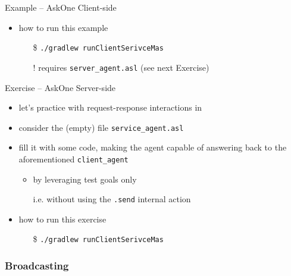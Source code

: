 \documentclass[presentation]{beamer}\mode<presentation>{\usetheme{AMSBolognaFC}}
\begin{document}
\begin{frame}[c, allowframebreaks]{Example \theJasonExample{} -- AskOne Client-side}
\begin{itemize}
    \vspace{.3cm}
    
    \item how to run this example
    \begin{itemize}
        \item[\$] \texttt{./gradlew run\alert{ClientSerivce}Mas}
        \item[!] requires \texttt{server\_agent.asl} (see next Exercise) 
    \end{itemize}
    
\end{itemize}
\end{frame}

\begin{frame}[c, allowframebreaks]{Exercise \theJasonExample{} -- AskOne Server-side}
\begin{itemize}
    \item let's practice with request-response interactions in \jason{}
    
    \vspace{.3cm}
    
    \item consider the (empty) file \texttt{service\_agent.asl}
    
    \vspace{.3cm}
    
    \item fill it with some \jason{} code, making the agent capable of answering back to the aforementioned \texttt{client\_agent}
    \begin{itemize}
        \item by leveraging test goals only
        \item[i.e.] without using the \texttt{.send} internal action
    \end{itemize}
    
    \vspace{.3cm}
    
    \item how to run this exercise
    \begin{itemize}
        \item[\$] \texttt{./gradlew run\alert{ClientSerivce}Mas}
    \end{itemize}
    
\end{itemize}
\end{frame}

\subsubsection{Broadcasting}
\end{document}
